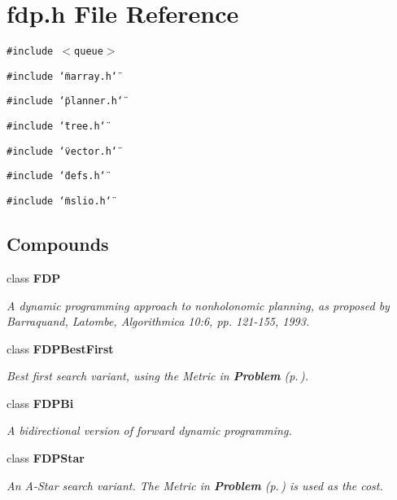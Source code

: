 \section{fdp.h File Reference}
\label{fdp_8h}
{\tt \#include $<$queue$>$}\par
{\tt \#include \char`\"{}marray.h\char`\"{}}\par
{\tt \#include \char`\"{}planner.h\char`\"{}}\par
{\tt \#include \char`\"{}tree.h\char`\"{}}\par
{\tt \#include \char`\"{}vector.h\char`\"{}}\par
{\tt \#include \char`\"{}defs.h\char`\"{}}\par
{\tt \#include \char`\"{}mslio.h\char`\"{}}\par
\subsection*{Compounds}
\begin{CompactItemize}
\item 
class {\bf FDP}
\begin{CompactList}\small\item\em A dynamic programming approach to nonholonomic planning, as proposed by Barraquand, Latombe, Algorithmica 10:6, pp. 121-155, 1993.\item\end{CompactList}\item 
class {\bf FDPBest\-First}
\begin{CompactList}\small\item\em Best first search variant, using the Metric in {\bf Problem} {\rm (p.\,\pageref{classProblem})}.\item\end{CompactList}\item 
class {\bf FDPBi}
\begin{CompactList}\small\item\em A bidirectional version of forward dynamic programming.\item\end{CompactList}\item 
class {\bf FDPStar}
\begin{CompactList}\small\item\em An A-Star search variant. The Metric in {\bf Problem} {\rm (p.\,\pageref{classProblem})} is used as the cost.\item\end{CompactList}\end{CompactItemize}
